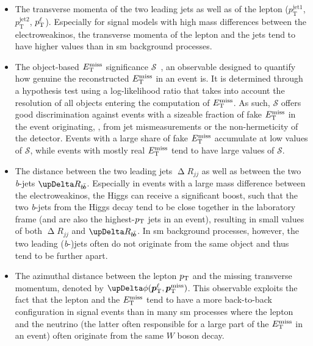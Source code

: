 \begin{itemize}
	\item The transverse momenta of the two leading jets as well as of the lepton ($p_\textrm{T}^\mathrm{jet1}$, $p_\textrm{T}^\mathrm{jet2}$, $p^\ell_{\textrm{T}}$). Especially for signal models with high mass differences between the electroweakinos, the transverse momenta of the lepton and the jets tend to have higher values than in \gls{sm} background processes.
	\item The object-based $E_{\textrm{T}}^{\textrm{miss}}$ significance $\mathcal{S}$~\cite{met_significance:2294922}, an observable designed to quantify how genuine the reconstructed $E_{\textrm{T}}^{\textrm{miss}}$ in an event is. It is determined through a hypothesis test using a log-likelihood ratio that takes into account the resolution of all objects entering the computation of $E_{\textrm{T}}^{\textrm{miss}}$. As such, $\mathcal{S}$ offers good discrimination against events with a sizeable fraction of fake $E_{\textrm{T}}^{\textrm{miss}}$ in the event originating, \eg, from jet mismeasurements or the non-hermeticity of the detector. Events with a large share of fake $E_{\textrm{T}}^{\textrm{miss}}$ accumulate at low values of $\mathcal{S}$, while events with mostly real $E_{\textrm{T}}^{\textrm{miss}}$ tend to have large values of $\mathcal{S}$. 
	\item The distance between the two leading jets $\upDelta R_{jj}$ as well as between the two \textit{b}-jets $\upDelta R_{b\hspace{-0.06em}\bar{b}}$. Especially in events with a large mass difference between the electroweakinos, the Higgs can receive a significant boost, such that the two \textit{b}-jets from the Higgs decay tend to be close together in the laboratory frame (and are also the highest-$p_{\mathrm{T}}$ jets in an event), resulting in small values of both $\upDelta R_{jj}$ and $\upDelta R_{b\hspace{-0.06em}\bar{b}}$. In \gls{sm} background processes, however, the two leading (\textit{b}-)jets often do not originate from the same object and thus tend to be further apart.
	\item The azimuthal distance between the lepton $p_{\mathrm{T}}$ and the missing transverse momentum, denoted by $\upDelta \phi (\makemebold{p}_\mathrm{T}^\ell, \makemebold{p}_\mathrm{T}^\mathrm{miss})$. This observable exploits the fact that the lepton and the $E_{\textrm{T}}^{\textrm{miss}}$ tend to have a more back-to-back configuration in signal events than in many \gls{sm} processes where the lepton and the neutrino (the latter often responsible for a large part of the $E_{\textrm{T}}^{\textrm{miss}}$ in an event) often originate from the same $W$ boson decay.
\end{itemize}

